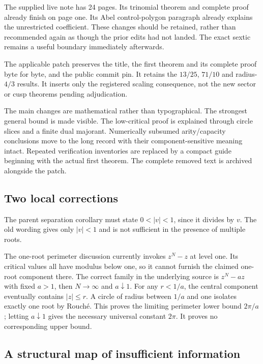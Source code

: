\documentclass[11pt,a4paper]{article}
\theoremstyle{remark}\newtheorem{remark}[theorem]{Remark}
\begin{document}
The supplied live note has 24 pages. Its trinomial theorem and complete
proof already finish on page one. Its Abel control-polygon paragraph already
explains the unrestricted coefficient. These changes should be retained,
rather than recommended again as though the prior edits had not landed.
The exact sextic remains a useful boundary immediately afterwards.

The applicable patch preserves the title, the first theorem and its complete
proof byte for byte, and the public commit pin. It retains the $13/25$,
$71/10$ and radius-$4/3$ results. It inserts only the registered scaling
consequence, not the new sector or cusp theorems pending adjudication.

The main changes are mathematical rather than typographical. The strongest
general bound is made visible. The low-critical proof is explained through
circle slices and a finite dual majorant. Numerically subsumed arity/capacity
conclusions move to the long record with their component-sensitive meaning
intact. Repeated verification inventories are replaced by a compact guide
beginning with the actual first theorem. The complete removed text is
archived alongside the patch.

\subsection{Two local corrections}

The parent separation corollary must state $0<|v|<1$, since it divides by
$v$. The old wording gives only $|v|<1$ and is not sufficient in the
presence of multiple roots.

The one-root perimeter discussion currently invokes $z^N-z$ at level one.
Its critical values all have modulus below one, so it cannot furnish the
claimed one-root component there. The correct family in the underlying
source is $z^N-az$ with fixed $a>1$, then $N\to\infty$ and $a\downarrow1$.
For any $r<1/a$, the central component eventually contains $|z|\le r$.
A circle of radius between $1/a$ and one isolates exactly one root by
Rouch\'e. This proves the limiting perimeter lower bound $2\pi/a$;
letting $a\downarrow1$ gives the necessary universal constant $2\pi$.
It proves no corresponding upper bound.

\subsection{A structural map of insufficient information}
\end{document}
